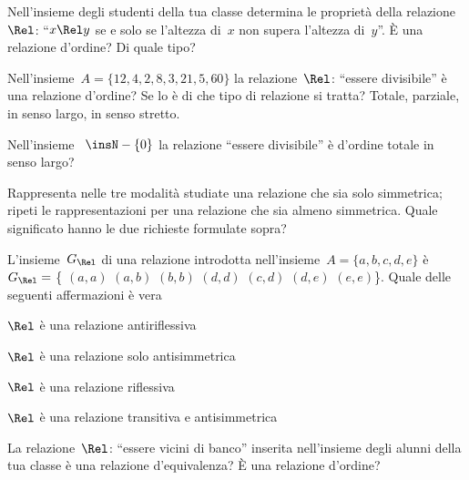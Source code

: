 \begin{multicols}{2}
\begin{esercizio}
\end{esercizio}

\begin{esercizio}
\label{ese:B.48}
Nell'insieme degli studenti della tua classe determina le proprietà della 
relazione~$\Rel$: ``$x \Rel y$ se e solo se l'altezza di~$x$ non supera 
l'altezza di~$y$''. È una relazione d'ordine? Di quale tipo?
\end{esercizio}

\begin{esercizio}
\label{ese:B.49}
Nell'insieme~$A = \{ 12, 4, 2, 8, 3, 21, 5, 60 \}$ la relazione~$\Rel$: 
``essere divisibile'' è una relazione d'ordine? Se lo è di che tipo di 
relazione si tratta? Totale, parziale, in senso largo, in senso stretto.
\end{esercizio}

\begin{esercizio}
\label{ese:B.50}
Nell'insieme ~$\insN - \{ 0 \}$ la relazione ``essere divisibile'' è d'ordine 
totale in senso largo?
\end{esercizio}

\begin{esercizio}
\label{ese:B.51}
Rappresenta nelle tre modalità studiate una relazione che sia solo simmetrica; 
ripeti le rappresentazioni per una relazione che sia almeno simmetrica. 
Quale significato hanno le due richieste formulate sopra?
\end{esercizio}

\begin{esercizio}
\label{ese:B.52}
L'insieme~$G_\Rel$ di una relazione introdotta 
nell'insieme~$A = \{ a, b, c, d, e \}$ 
è~$G_\Rel =$ \{ $(a,a)$ $(a,b)$ $(b,b)$ $(d,d)$ $(c,d)$ $(d,e)$ $(e,e)$\}.
Quale delle seguenti affermazioni è vera
\begin{enumeratea}
\item $\Rel$ è una relazione antiriflessiva
\item $\Rel$ è una relazione solo antisimmetrica
\item $\Rel$ è una relazione riflessiva
\item $\Rel$ è una relazione transitiva e antisimmetrica
\end{enumeratea}
\end{esercizio}

\begin{esercizio}
\label{ese:B.53}
La relazione~$\Rel$: ``essere vicini di banco'' inserita nell'insieme degli 
alunni della tua classe è una relazione d'equivalenza? 
È una relazione d'ordine?
\end{esercizio}



\end{multicols}
